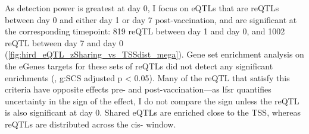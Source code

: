 As detection power is greatest at day 0, 
I focus on \glspl{eQTL} that are reQTLs between day 0 and either day 1 or day 7 post-vaccination, 
and are significant at the corresponding timepoint:
819 reQTL between day 1 and day 0, 
and 1002 reQTL between day 7 and day 0 (\autoref{fig:hird_eQTL_zSharing_vs_TSSdist_mega}).
Gene set enrichment analysis on the eGenes targets for these sets of \glspl{reQTL} did not detect any significant enrichments (, g:SCS adjusted p < 0.05).
%
%
Many of the \gls{reQTL} that satisfy this criteria have opposite effects pre- and post-vaccination---as lfsr quantifies uncertainty in the sign of the effect, I do not compare the sign unless the reQTL is also significant at day 0.
Shared \glspl{eQTL} are enriched close to the \gls{TSS}, whereas \glspl{reQTL} are distributed across the cis- window.

%

